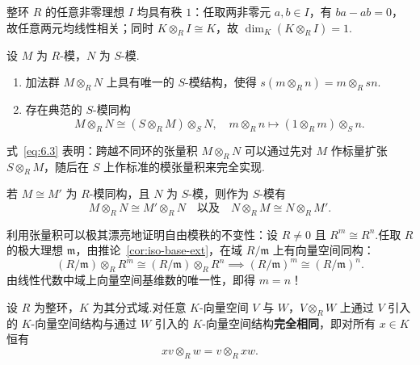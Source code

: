 \begin{example}\label{ex:ideal-rank-one}
整环 $R$ 的任意非零理想 $I$ 均具有秩 $1$：任取两非零元 $a, b \in I$，有 $ba - ab = 0$，故任意两元均线性相关；同时 $K \otimes_R I \cong K$，故 $\dim_K(K \otimes_R I) = 1$.
\end{example}

\begin{theorem}\label{thm:m-tensor-n-s-mod}
设 $M$ 为 $R$-模，$N$ 为 $S$-模.
\begin{enumerate}
  \item 加法群 $M \otimes_R N$ 上具有唯一的 $S$-模结构，使得 $s(m \otimes_R n) = m \otimes_R sn$.
  \item 存在典范的 $S$-模同构
  \begin{equation}
    M \otimes_R N \cong (S \otimes_R M) \otimes_S N, \quad m \otimes_R n \mapsto (1 \otimes_R m) \otimes_S n. \label{eq:6.3}
  \end{equation}
\end{enumerate}
\end{theorem}

式~\eqref{eq:6.3} 表明：跨越不同环的张量积 $M \otimes_R N$ 可以通过先对 $M$ 作标量扩张 $S \otimes_R M$，随后在 $S$ 上作标准的模张量积来完全实现.

\begin{corollary}\label{cor:iso-base-ext}
若 $M \cong M'$ 为 $R$-模同构，且 $N$ 为 $S$-模，则作为 $S$-模有
\[
  M \otimes_R N \cong M' \otimes_R N \quad\text{以及}\quad N \otimes_R M \cong N \otimes_R M'.
\]
\end{corollary}

\begin{example}\label{ex:invariance-rank-free}
利用张量积可以极其漂亮地证明自由模秩的不变性：设 $R \neq 0$ 且 $R^m \cong R^n$.任取 $R$ 的极大理想 $\mathfrak{m}$，由推论~\ref{cor:iso-base-ext}，在域 $R/\mathfrak{m}$ 上有向量空间同构：
\[
  (R/\mathfrak{m}) \otimes_R R^m \cong (R/\mathfrak{m}) \otimes_R R^n \implies (R/\mathfrak{m})^m \cong (R/\mathfrak{m})^n.
\]
由线性代数中域上向量空间基维数的唯一性，即得 $m = n$！
\end{example}

\begin{theorem}\label{thm:k-vector-tensor-same}
设 $R$ 为整环，$K$ 为其分式域.对任意 $K$-向量空间 $V$ 与 $W$，$V \otimes_R W$ 上通过 $V$ 引入的 $K$-向量空间结构与通过 $W$ 引入的 $K$-向量空间结构\textbf{完全相同}，即对所有 $x \in K$ 恒有
\[
  xv \otimes_R w = v \otimes_R xw.
\]
\end{theorem}

